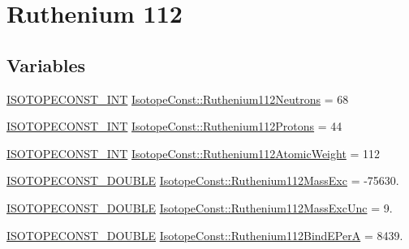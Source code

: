 \hypertarget{group___isotope_const-_ruthenium-_ru112}{}\section{Ruthenium 112}
\label{group___isotope_const-_ruthenium-_ru112}
\subsection*{Variables}
\begin{DoxyCompactItemize}
\item 
\mbox{\hyperlink{group___isotope_const-_macros_ga5f18360b3e99483a35c32d789e62621c}{I\+S\+O\+T\+O\+P\+E\+C\+O\+N\+S\+T\+\_\+\+I\+NT}} \mbox{\hyperlink{group___isotope_const-_ruthenium-_ru112_gaf265aeeab807ecfd91493f317334d1f1}{Isotope\+Const\+::\+Ruthenium112\+Neutrons}} = 68
\item 
\mbox{\hyperlink{group___isotope_const-_macros_ga5f18360b3e99483a35c32d789e62621c}{I\+S\+O\+T\+O\+P\+E\+C\+O\+N\+S\+T\+\_\+\+I\+NT}} \mbox{\hyperlink{group___isotope_const-_ruthenium-_ru112_ga157530d0c8468841dc438f32054854e4}{Isotope\+Const\+::\+Ruthenium112\+Protons}} = 44
\item 
\mbox{\hyperlink{group___isotope_const-_macros_ga5f18360b3e99483a35c32d789e62621c}{I\+S\+O\+T\+O\+P\+E\+C\+O\+N\+S\+T\+\_\+\+I\+NT}} \mbox{\hyperlink{group___isotope_const-_ruthenium-_ru112_gabdad3ac206f73dc023a8eedd695cf3dd}{Isotope\+Const\+::\+Ruthenium112\+Atomic\+Weight}} = 112
\item 
\mbox{\hyperlink{group___isotope_const-_macros_ga8f45a7272ce02c0b4c65c44636ed719a}{I\+S\+O\+T\+O\+P\+E\+C\+O\+N\+S\+T\+\_\+\+D\+O\+U\+B\+LE}} \mbox{\hyperlink{group___isotope_const-_ruthenium-_ru112_gaf734c1458d099d23d11a79b24833a65f}{Isotope\+Const\+::\+Ruthenium112\+Mass\+Exc}} = -\/75630.
\item 
\mbox{\hyperlink{group___isotope_const-_macros_ga8f45a7272ce02c0b4c65c44636ed719a}{I\+S\+O\+T\+O\+P\+E\+C\+O\+N\+S\+T\+\_\+\+D\+O\+U\+B\+LE}} \mbox{\hyperlink{group___isotope_const-_ruthenium-_ru112_ga01183dcb684fdd9ce1309ff0c1787731}{Isotope\+Const\+::\+Ruthenium112\+Mass\+Exc\+Unc}} = 9.
\item 
\mbox{\hyperlink{group___isotope_const-_macros_ga8f45a7272ce02c0b4c65c44636ed719a}{I\+S\+O\+T\+O\+P\+E\+C\+O\+N\+S\+T\+\_\+\+D\+O\+U\+B\+LE}} \mbox{\hyperlink{group___isotope_const-_ruthenium-_ru112_gab98db94901355f06817a6ddcc2cb6c1c}{Isotope\+Const\+::\+Ruthenium112\+Bind\+E\+PerA}} = 8439.
\item 

\end{DoxyCompactItemize}
